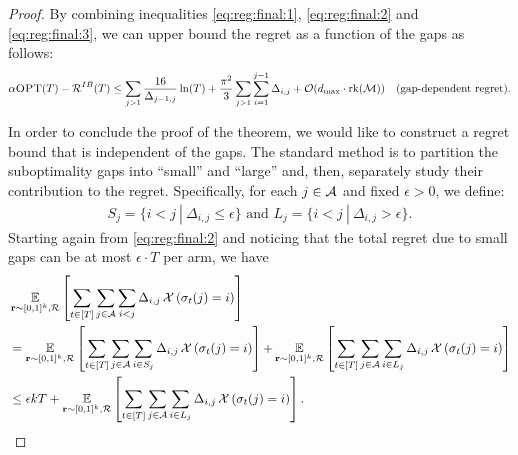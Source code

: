 \begin{proof}
By combining inequalities \eqref{eq:reg:final:1}, \eqref{eq:reg:final:2} and \eqref{eq:reg:final:3}, we can upper bound the regret as a function of the gaps as follows:
\begin{align*}
    \alpha \textsc{OPT}(T) - \operatorname{\mathcal{R}}^{IB}(T) \leq \sum_{j > 1} \frac{16}{\Delta_{j-1,j}}\ln(T) + \frac{\pi^2}{3} \sum_{j > 1}\sum_{i = 1}^{j-1} \Delta_{i,j} + \mathcal{O}(d_{\max}\cdot \operatorname{rk}(\operatorname{\mathcal{M}}))~~ \text{ (gap-dependent regret)}.
\end{align*}

In order to conclude the proof of the theorem, we would like to construct a regret bound that is independent of the gaps. The standard method is to partition the suboptimality gaps into ``small'' and ``large'' and, then, separately study their contribution to the regret. Specifically, for each $j \in \operatorname{\mathcal{A}}$ and fixed $\epsilon > 0$, we define:
\begin{align*}
    S_j = \{i < j~|~\Delta_{i,j} \leq \epsilon\}\text{ and }L_j = \{i < j~|~\Delta_{i,j} > \epsilon\}.
\end{align*}
Starting again from \eqref{eq:reg:final:2} and noticing that the total regret due to small gaps can be at most $\epsilon\cdot T$ per arm, we have
\begin{align}
&\mathop{\underset{\operatorname{\mathbf{r}} \sim [0,1]^k, \mathcal{R}}{\mathbb{E}}\left[\sum_{t \in [T]}\sum_{j \in \operatorname{\mathcal{A}}}\sum_{i < j} \Delta_{i,j} \mathop{\mathcal{X}\left(\sigma_t(j) = i\right)}\right]} \notag \\
&= \mathop{\underset{\operatorname{\mathbf{r}} \sim [0,1]^k, \mathcal{R}}{\mathbb{E}}\left[\sum_{t \in [T]}\sum_{j \in \operatorname{\mathcal{A}}}\sum_{i \in S_j} \Delta_{i,j} \mathop{\mathcal{X}\left(\sigma_t(j) = i\right)}\right]} + \mathop{\underset{\operatorname{\mathbf{r}} \sim [0,1]^k, \mathcal{R}}{\mathbb{E}}\left[\sum_{t \in [T]}\sum_{j \in \operatorname{\mathcal{A}}}\sum_{i \in L_j} \Delta_{i,j} \mathop{\mathcal{X}\left(\sigma_t(j) = i\right)}\right]} \notag\\
&\leq 
\epsilon k  T + \mathop{\underset{\operatorname{\mathbf{r}} \sim [0,1]^k, \mathcal{R}}{\mathbb{E}}\left[\sum_{t \in [T]}\sum_{j \in \operatorname{\mathcal{A}}}\sum_{i \in L_j} \Delta_{i,j} \mathop{\mathcal{X}\left(\sigma_t(j) = i\right)}\right]}. \label{eq:reg:final:4}
\end{align}


\end{proof}

